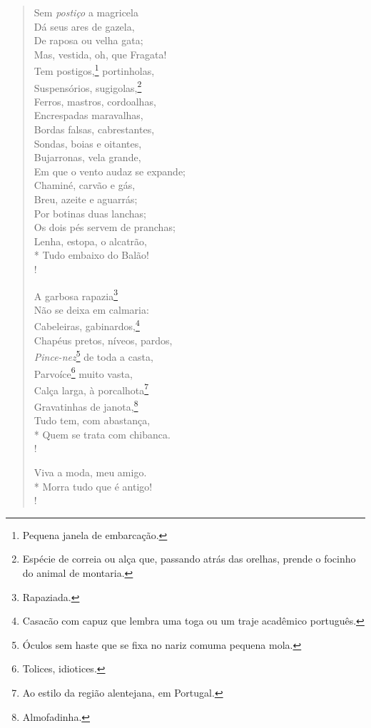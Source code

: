 \begin{verse}
Sem \emph{postiço} a magricela\\
Dá seus ares de gazela,\\
De raposa ou velha gata;\\
Mas, vestida, oh, que Fragata!\\
Tem postigos,\footnote{ Pequena janela de embarcação.} portinholas,\\
Suspensórios, sugigolas,\footnote{ Espécie de correia ou alça que, 
                                  passando atrás das orelhas, prende 
                                  o focinho do animal de montaria.}\\
Ferros, mastros, cordoalhas,\\
Encrespadas maravalhas,\\
Bordas falsas, cabrestantes,\\
Sondas, boias e oitantes,\\
Bujarronas, vela grande,\\
Em que o vento audaz se expande;\\
Chaminé, carvão e gás,\\
Breu, azeite e aguarrás;\\
Por botinas duas lanchas;\\
Os dois pés servem de pranchas;\\
Lenha, estopa, o alcatrão,\\*
Tudo embaixo do Balão!\\!

A garbosa rapazia\footnote{ Rapaziada.}\\
Não se deixa em calmaria:\\
Cabeleiras, gabinardos,\footnote{ Casacão com capuz que lembra uma toga ou um traje acadêmico português.}\\
Chapéus pretos, níveos, pardos,\\
\emph{Pince-nez}\footnote{ Óculos sem haste que se fixa no nariz comuma pequena mola.} de toda a casta,\\
Parvoíce\footnote{ Tolices, idiotices.} muito vasta,\\
Calça larga, à porcalhota\footnote{ Ao estilo da região alentejana, em Portugal.}\\
Gravatinhas de janota,\footnote{ Almofadinha.}\\
Tudo tem, com abastança,\\*
Quem se trata com chibanca.\\!

Viva a moda, meu amigo.\\*
Morra tudo que é antigo!\\!


\end{verse}
